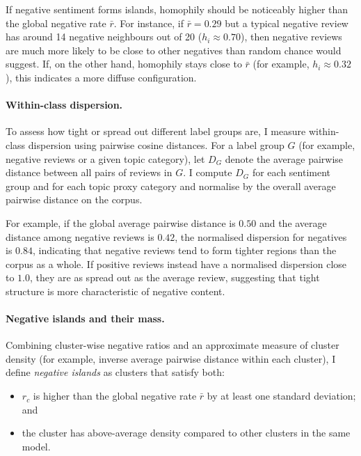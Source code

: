 \documentclass[a4paper,11pt]{article}
\begin{document}
If negative sentiment forms islands, homophily should be noticeably higher than the global negative rate $\bar{r}$. 
For instance, if $\bar{r} = 0.29$ but a typical negative review has around 14 negative neighbours out of 20 ($h_i \approx 0.70$), then negative reviews are much more likely to be close to other negatives than random chance would suggest. 
If, on the other hand, homophily stays close to $\bar{r}$ (for example, $h_i \approx 0.32$), this indicates a more diffuse configuration.

\paragraph{Within-class dispersion.}

To assess how tight or spread out different label groups are, I measure within-class dispersion using pairwise cosine distances. 
For a label group $G$ (for example, negative reviews or a given topic category), let $D_G$ denote the average pairwise distance between all pairs of reviews in $G$. 
I compute $D_G$ for each sentiment group and for each topic proxy category and normalise by the overall average pairwise distance on the corpus. 

For example, if the global average pairwise distance is $0.50$ and the average distance among negative reviews is $0.42$, the normalised dispersion for negatives is $0.84$, indicating that negative reviews tend to form tighter regions than the corpus as a whole. 
If positive reviews instead have a normalised dispersion close to $1.0$, they are as spread out as the average review, suggesting that tight structure is more characteristic of negative content.

\paragraph{Negative islands and their mass.}

Combining cluster-wise negative ratios and an approximate measure of cluster density (for example, inverse average pairwise distance within each cluster), I define \emph{negative islands} as clusters that satisfy both:
\begin{itemize}
    \item $r_c$ is higher than the global negative rate $\bar{r}$ by at least one standard deviation; and
    \item the cluster has above-average density compared to other clusters in the same model.
\end{itemize}
\end{document}
